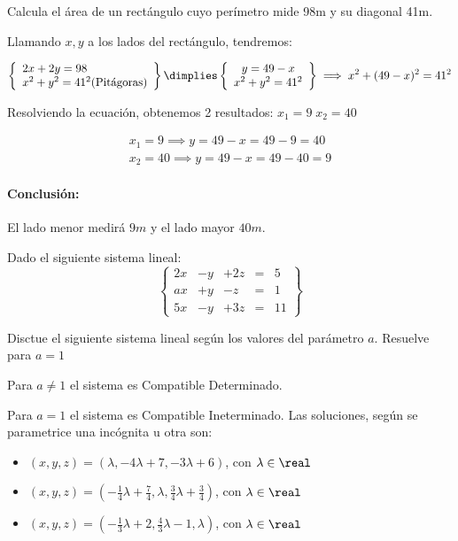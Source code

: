 \documentclass[palatino,nosec,nochap,nobuilddate]{Docencia}
\begin{document}
\begin{problem}
Calcula el área de un rectángulo cuyo perímetro mide 98m y su diagonal 41m.

\solution

Llamando $x,y$ a los lados del rectángulo, tendremos:

\[
\left\{
	\begin{array}{l}
		2x+2y = 98\\
		x^2+y^2 = 41^2 \text{(Pitágoras)}
	\end{array}
\right\} \dimplies 
\left\{
	\begin{array}{c}
		y = 49-x\\
		x^2+y^2 = 41^2 
	\end{array}
\right\} \implies x^2 + (49-x)^2  = 41^2
\]

Resolviendo la ecuación, obtenemos 2 resultados: $x_1 = 9\; x_2=40$

\[
	\begin{array}{c}
		x_1 = 9 \implies y=49-x = 49-9 = 40\\
		x_2 = 40 \implies y=49-x = 49-40 = 9
	\end{array}
\]

\paragraph{Conclusión: } El lado menor medirá $9m$ y el lado mayor $40m$.

\end{problem}

\begin{problem}
Dado el siguiente sistema lineal:
\[
	\left\{
	\begin{array}{ccccl}
		2x&-y&+2z &= &5\\
		ax&+y&-z& = &1\\
		5x&-y&+3z& = &11
	\end{array}
	\right\}
\]

\ppart Disctue el siguiente sistema lineal según los valores del parámetro $a$.
\ppart Resuelve para $a=1$

\solution


Para $a\neq 1$ el sistema es Compatible Determinado.

Para $a=1$ el sistema es Compatible Ineterminado. Las soluciones, según se parametrice una incógnita u otra son:
\begin{itemize}
	\item $(x,y,z) = (\lambda,-4\lambda+7,-3\lambda+6)$,  con $\lambda\in\real$
	\item $(x,y,z) = \left(-\frac{1}{4}\lambda +\frac{7}{4},\lambda, \frac{3}{4}\lambda + \frac{3}{4}\right)$, con $\lambda\in\real$
	\item $(x,y,z) = \left(-\frac{1}{3}\lambda + 2, \frac{4}{3}\lambda - 1 ,\lambda\right)$, con $\lambda\in\real$
\end{itemize}



\end{problem}
\end{document}
